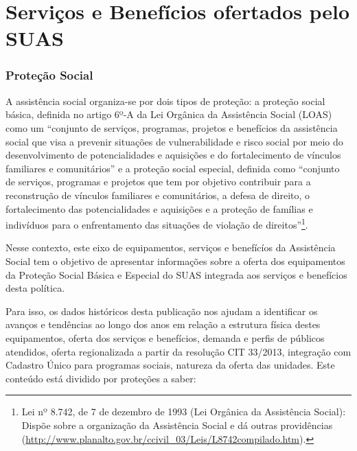\documentclass[
  brazilian]{report}
\begin{document}
\hypertarget{serviuxe7os-e-benefuxedcios-ofertados-pelo-suas}{%
\chapter{Serviços e Benefícios ofertados pelo
SUAS}\label{serviuxe7os-e-benefuxedcios-ofertados-pelo-suas}}

\hypertarget{proteuxe7uxe3o-social}{%
\subsection{Proteção Social}\label{proteuxe7uxe3o-social}}

A assistência social organiza-se por dois tipos de proteção: a proteção
social básica, definida no artigo 6º-A da Lei Orgânica da Assistência
Social (LOAS) como um ``conjunto de serviços, programas, projetos e
benefícios da assistência social que visa a prevenir situações de
vulnerabilidade e risco social por meio do desenvolvimento de
potencialidades e aquisições e do fortalecimento de vínculos familiares
e comunitários'' e a proteção social especial, definida como ``conjunto
de serviços, programas e projetos que tem por objetivo contribuir para a
reconstrução de vínculos familiares e comunitários, a defesa de direito,
o fortalecimento das potencialidades e aquisições e a proteção de
famílias e indivíduos para o enfrentamento das situações de violação de
direitos''\footnote{Lei nº 8.742, de 7 de dezembro de 1993 (Lei Orgânica da Assistência Social): Dispõe sobre a organização da Assistência Social e dá outras providências (\url{http://www.planalto.gov.br/ccivil_03/Leis/L8742compilado.htm}).}.

Nesse contexto, este eixo de equipamentos, serviços e benefícíos da
Assistência Social tem o objetivo de apresentar informações sobre a
oferta dos equipamentos da Proteção Social Básica e Especial do SUAS
integrada aos serviços e benefícios desta política.

Para isso, os dados históricos desta publicação nos ajudam a identificar
os avanços e tendências ao longo dos anos em relação a estrutura física
destes equipamentos, oferta dos serviços e benefícios, demanda e perfis
de públicos atendidos, oferta regionalizada a partir da resolução CIT
33/2013, integração com Cadastro Único para programas sociais, natureza
da oferta das unidades. Este conteúdo está dividido por proteções a
saber:
\end{document}
